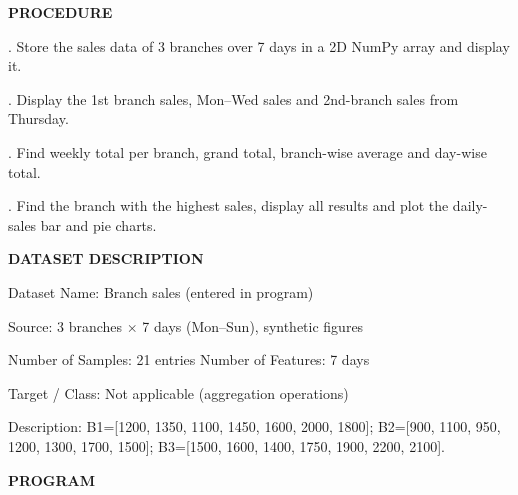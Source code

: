 \documentclass[11pt,twoside]{article}
\newcommand{\expheading}[1]{{\fontsize{14}{17}\selectfont\textbf{#1}\par}}
\newcommand{\toevenpage}{\clearpage\ifodd\value{page}\null\thispagestyle{empty}\newpage\fi}
\begin{document}
{\expheading{PROCEDURE}
\vspace{4pt}
. Store the sales data of 3 branches over 7 days in a 2D NumPy array and display it.\par
{}. Display the 1st branch sales, Mon--Wed sales and 2nd-branch sales from Thursday.\par
{}. Find weekly total per branch, grand total, branch-wise average and day-wise total.\par
{}. Find the branch with the highest sales, display all results and plot the daily-sales bar and pie charts. \par
\vspace{4pt}

\expheading{DATASET DESCRIPTION}
\vspace{4pt}
\noindent Dataset Name: Branch sales (entered in program)\par
\noindent Source: 3 branches $\times$ 7 days (Mon--Sun), synthetic figures\par
\noindent Number of Samples: 21 entries \hspace{0.3cm} Number of Features: 7 days\par
\noindent Target / Class: Not applicable (aggregation operations)\par
\noindent Description: B1=[1200, 1350, 1100, 1450, 1600, 2000, 1800]; B2=[900, 1100, 950, 1200, 1300, 1700, 1500]; B3=[1500, 1600, 1400, 1750, 1900, 2200, 2100]. \par
\vspace{4pt}
} %

\toevenpage
\expheading{PROGRAM}
\vspace{6pt}
\end{document}
